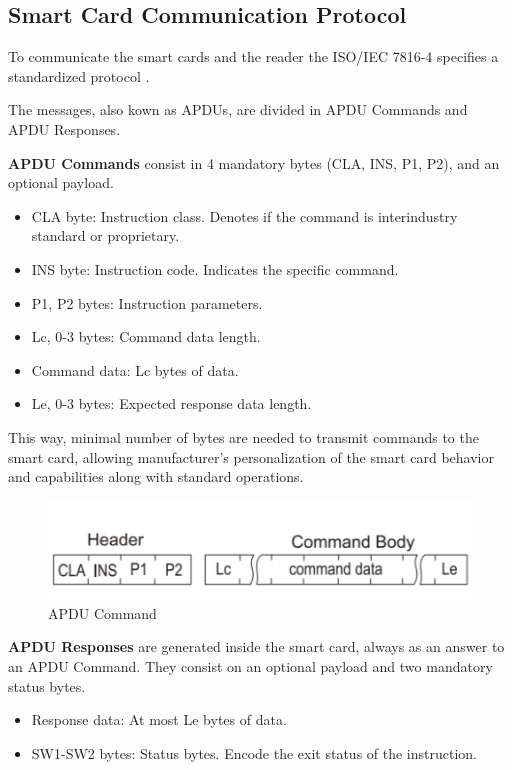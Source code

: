 \subsection{Smart Card Communication Protocol}\label{subsec:APDU}

To communicate the smart cards and the reader the ISO/IEC 7816-4 \citep{APDUISO} specifies a standardized protocol .

The messages, also kown as \acp{APDU}, are divided in APDU Commands and APDU Responses.

\textbf{APDU Commands} consist in 4 mandatory bytes (CLA, INS, P1, P2), and an optional payload.

\begin{itemize}
	\item CLA byte: Instruction class. Denotes if the command is interindustry standard or proprietary.
	\item INS byte: Instruction code. Indicates the specific command.
	\item P1, P2 bytes: Instruction parameters.
	\item Lc, 0-3 bytes: Command data length.
	\item Command data: Lc bytes of data.
	\item Le, 0-3 bytes: Expected response data length.
\end{itemize}

This way, minimal number of bytes are needed to transmit commands to the smart card, allowing manufacturer's personalization of the smart card behavior and capabilities along with standard operations.

\begin{figure}[bth]
	\begin{center}
		\includegraphics[width=0.55\linewidth]{gfx/APDUCommand}
	\end{center}
	\caption{APDU Command}
	\label{fig:APDUCommand}
\end{figure}


\textbf{APDU Responses} are generated inside the smart card, always as an answer to an APDU Command. They consist on an optional payload and two mandatory status bytes.


\begin{itemize}
	\item Response data: At most Le bytes of data.
	\item SW1-SW2 bytes: Status bytes. Encode the exit status of the instruction.
\end{itemize}

